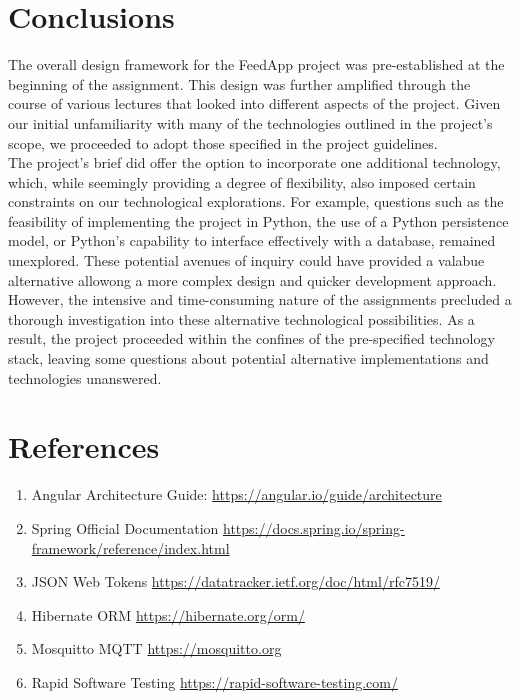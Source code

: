 \clearpage
\section{Conclusions}

\noindent The overall design framework for the FeedApp project was pre-established at the beginning of the assignment. This design was further amplified through the course of various lectures that looked into different aspects of the project.  Given our initial unfamiliarity with many of the technologies outlined in the project's scope, we proceeded to adopt those specified in the project guidelines.\\

\noindent The project's brief did offer the option to incorporate one additional technology, which, while seemingly providing a degree of flexibility, also imposed certain constraints on our technological explorations. For example, questions such as the feasibility of implementing the project in Python, the use of a Python persistence model, or Python's capability to interface effectively with a database, remained unexplored. These potential avenues of inquiry could have provided a valabue alternative allowong a more complex design and quicker development approach.\\

\noindent However, the intensive and time-consuming nature of the assignments precluded a thorough investigation into these alternative technological possibilities. As a result, the project proceeded within the confines of the pre-specified technology stack, leaving some questions about potential alternative implementations and technologies unanswered.

\section*{References}
\begin{enumerate}
  	\item Angular Architecture Guide: \url{https://angular.io/guide/architecture }
	\item Spring Official Documentation \url{https://docs.spring.io/spring-framework/reference/index.html}
          \item JSON Web Tokens  \url{https://datatracker.ietf.org/doc/html/rfc7519/}
 	\item Hibernate ORM \url{https://hibernate.org/orm/}
	\item Mosquitto MQTT \url{https://mosquitto.org}
	\item Rapid Software Testing  \url{https://rapid-software-testing.com/}
\end{enumerate}